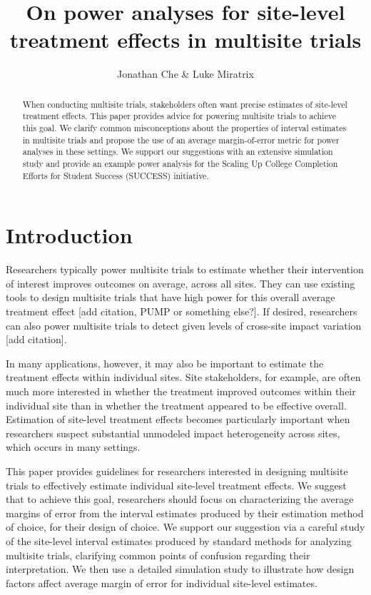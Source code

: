 \documentclass[]{article}
\title{On power analyses for site-level treatment effects in multisite trials}
\author{Jonathan Che \& Luke Miratrix}
\begin{document}
\maketitle


\begin{abstract}
    When conducting multisite trials, stakeholders often want precise estimates of site-level treatment effects.
    This paper provides advice for powering multisite trials to achieve this goal.
    We clarify common misconceptions about the properties of interval estimates in multisite trials and propose the use of an average margin-of-error metric for power analyses in these settings.
    We support our suggestions with an extensive simulation study and provide an example power analysis for the Scaling Up College Completion Efforts for Student Success (SUCCESS) initiative.
\end{abstract}

\section{Introduction}

Researchers typically power multisite trials to estimate whether their intervention of interest improves outcomes on average, across all sites.
They can use existing tools to design multisite trials that have high power for this overall average treatment effect [add citation, PUMP or something else?].
If desired, researchers can also power multisite trials to detect given levels of cross-site impact variation [add citation].

In many applications, however, it may also be important to estimate the treatment effects within individual sites.
Site stakeholders, for example, are often much more interested in whether the treatment improved outcomes within their individual site than in whether the treatment appeared to be effective overall.
Estimation of site-level treatment effects becomes particularly important when researchers suspect substantial unmodeled impact heterogeneity across sites, which occurs in many settings.

This paper provides guidelines for researchers interested in designing multisite trials to effectively estimate individual site-level treatment effects.
We suggest that to achieve this goal, researchers should focus on characterizing the average margins of error from the interval estimates produced by their estimation method of choice, for their design of choice.
We support our suggestion via a careful study of the site-level interval estimates produced by standard methods for analyzing multisite trials, clarifying common points of confusion regarding their interpretation.
We then use a detailed simulation study to illustrate how design factors affect average margin of error for individual site-level estimates.
\end{document}
